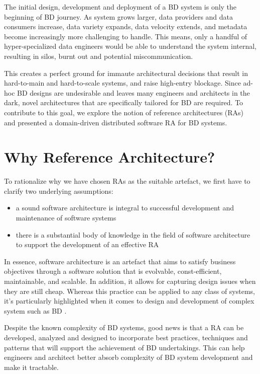 \documentclass[runningheads]{llncs}
\begin{document}
The initial design, development and deployment of a BD system is only the beginning of BD journey. As system grows larger, data providers and data consumers increase, data variety expands, data velocity extends, and metadata become increasingly more challenging to handle. This means, only a handful of hyper-specialized data engineers would be able to understand the system internal, resulting in silos, burnt out and potential miscommunication. 

This creates a perfect ground for immaute architectural decisions that result in hard-to-main and hard-to-scale systems, and raise high-entry blockage. Since ad-hoc BD designs are undesirable and leaves many engineers and architects in the dark, novel architectures that are specifically tailored for BD are required. To contribute to this goal, we explore the notion of reference architectures (RAs) and presented a domain-driven distributed software RA for BD systems.

\section{Why Reference Architecture?}
To rationalize why we have chosen RAs as the suitable artefact, we first have to clarify two underlying assumptions: 

\begin{itemize}
    \item a sound software architecture is integral to successful development and maintenance of software systems 
    \item there is a substantial body of knowledge in the field of software architecture to support the development of an effective RA
\end{itemize}

In essence, software architecture is an artefact that aims to satisfy business objectives through a software solution that is evolvable, const-efficient, maintainable, and scalable. In addition, it allows for capturing design issues when they are still cheap. Whereas this practice can be applied to any class of systems, it's particularly highlighted when it comes to design and development of complex system such as BD \cite{ataei2021neomycelia}. 

Despite the known complexity of BD systems, good news is that a RA can be developed, analyzed and designed to incorporate best practices, techniques and patterns that will support the achievement of BD undertakings. This can help engineers and architect better absorb complexity of BD system development and make it tractable. 
\end{document}
